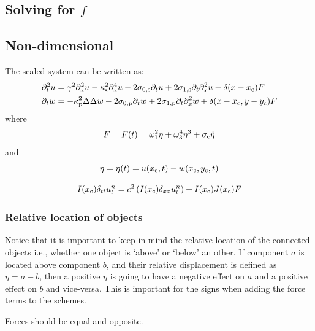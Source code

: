 \subsection{Solving for $f$}


\subsection{Non-dimensional}
The scaled system can be written as:
\begin{align}
    \ptt u &= \gamma^2 \pxx u - \kappa_\stxt^2 \pxxxx u - 2\szX[\stxt]\pt u + 2\soX[\stxt] \pt\pxx u - \delta(x-x_\ctxt)F\\
   \pt w &= -\kappa_\ptxt^2\Delta\Delta w - 2\szX[\ptxt]\pt w + 2\soX[\ptxt] \pt\pxx w + \delta(x-x_\ctxt, y-y_\ctxt)F
\end{align}
where
\begin{equation}
    F = F(t) = \omega_1^2\eta+\omega_3^4\eta^3+\sigma_{\text{c}} \dot\eta
\end{equation}
and
\begin{equation}
    \eta = \eta(t) = u(x_{\text{c}}, t) - w(x_{\text{c}}, y_{\text{c}}, t)
\end{equation}


\begin{equation}
    I(x_{\text{c}})\delta_{tt}u_l^n = c^2
    \left(I(x_{\text{c}})\delta_{xx}u_l^n\right) + I(x_{\text{c}})J(x_{\text{c}})F
\end{equation}


\subsubsection{Relative location of objects}
Notice that it is important to keep in mind the relative location of the connected objects i.e., whether one object is `above' or `below' an other. 
If component $a$ is located above component $b$, and their relative displacement is defined as $\eta = a-b$, then a positive $\eta$ is going to have a negative effect on $a$ and a positive effect on $b$ and vice-versa. This is important for the signs when adding the force terms to the schemes.


Forces should be equal and opposite. 
